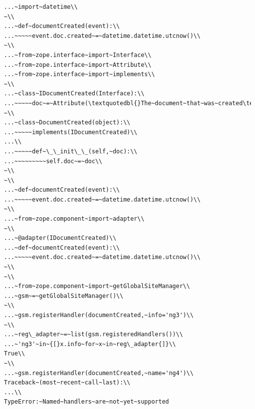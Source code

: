 \documentclass[a4paper,openany,twoside,draft]{book}
\begin{document}
\begin{verbatim}
...~import~datetime\\
~\\
...~def~documentCreated(event):\\
...~~~~~event.doc.created~=~datetime.datetime.utcnow()\\
~\\
...~from~zope.interface~import~Interface\\
...~from~zope.interface~import~Attribute\\
...~from~zope.interface~import~implements\\
~\\
...~class~IDocumentCreated(Interface):\\
...~~~~~doc~=~Attribute(\textquotedbl{}The~document~that~was~created\textquotedbl{})\\
~\\
...~class~DocumentCreated(object):\\
...~~~~~implements(IDocumentCreated)\\
...\\
...~~~~~def~\_\_init\_\_(self,~doc):\\
...~~~~~~~~~self.doc~=~doc\\
~\\
~\\
...~def~documentCreated(event):\\
...~~~~~event.doc.created~=~datetime.datetime.utcnow()\\
~\\
...~from~zope.component~import~adapter\\
~\\
...~@adapter(IDocumentCreated)\\
...~def~documentCreated(event):\\
...~~~~~event.doc.created~=~datetime.datetime.utcnow()\\
~\\
~\\
...~from~zope.component~import~getGlobalSiteManager\\
...~gsm~=~getGlobalSiteManager()\\
~\\
...~gsm.registerHandler(documentCreated,~info='ng3')\\
~\\
...~reg\_adapter~=~list(gsm.registeredHandlers())\\
...~'ng3'~in~{[}x.info~for~x~in~reg\_adapter{]}\\
True\\
~\\
...~gsm.registerHandler(documentCreated,~name='ng4')\\
Traceback~(most~recent~call~last):\\
...\\
TypeError:~Named~handlers~are~not~yet~supported
\end{verbatim}
\end{document}
